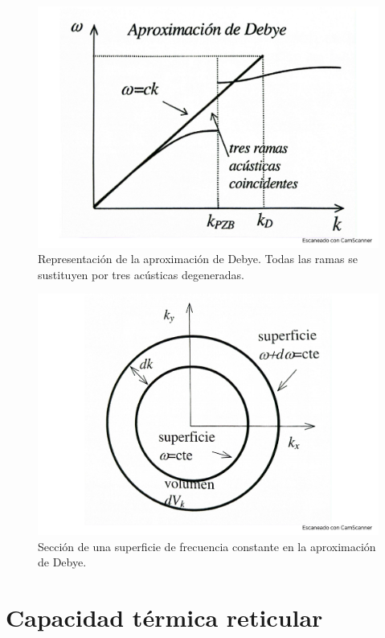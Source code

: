 \begin{figure}[h!] \centering
    \includegraphics[scale=0.37]{Cuerpo/Ch_05/Fotos libro 2.pdf}
    \caption{Representación de la aproximación de Debye. Todas las ramas se sustituyen por tres acústicas degeneradas.}
    \label{Fig:05-02}
\end{figure}



\begin{figure}[h!] \centering
    \includegraphics[scale=0.38]{Cuerpo/Ch_05/Fotos libro 3.pdf}
    \caption{Sección de una superficie de frecuencia constante en la aproximación de Debye.}
    \label{Fig:05-03}
\end{figure}    

\section{Capacidad térmica reticular}

